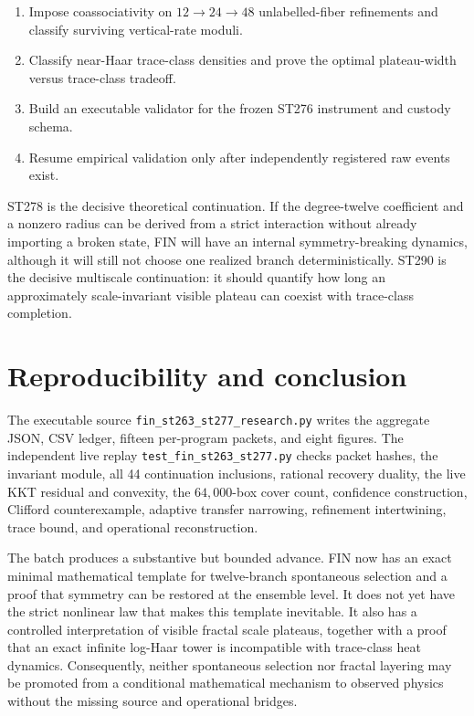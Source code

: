 \documentclass[11pt,a4paper]{article}
\begin{document}
\begin{enumerate}
from resetting costs.
\item[\textbf{ST289}.] Impose coassociativity on $12\to24\to48$ unlabelled-fiber refinements
and classify surviving vertical-rate moduli.
\item[\textbf{ST290}.] Classify near-Haar trace-class densities and prove the optimal
plateau-width versus trace-class tradeoff.
\item[\textbf{ST291}.] Build an executable validator for the frozen ST276 instrument and
custody schema.
\item[\textbf{ST292}.] Resume empirical validation only after independently registered raw
events exist.
\end{enumerate}

ST278 is the decisive theoretical continuation. If the degree-twelve coefficient and a
nonzero radius can be derived from a strict interaction without already importing a broken
state, FIN will have an internal symmetry-breaking dynamics, although it will still not
choose one realized branch deterministically. ST290 is the decisive multiscale continuation:
it should quantify how long an approximately scale-invariant visible plateau can coexist
with trace-class completion.

\section{Reproducibility and conclusion}

The executable source \texttt{fin\_st263\_st277\_research.py} writes the aggregate JSON,
CSV ledger, fifteen per-program packets, and eight figures. The independent live replay
\texttt{test\_fin\_st263\_st277.py} checks packet hashes, the invariant module, all 44
continuation inclusions, rational recovery duality, the live KKT residual and convexity,
the $64{,}000$-box cover count, confidence construction, Clifford counterexample, adaptive
transfer narrowing, refinement intertwining, trace bound, and operational reconstruction.

The batch produces a substantive but bounded advance. FIN now has an exact minimal
mathematical template for twelve-branch spontaneous selection and a proof that symmetry can
be restored at the ensemble level. It does not yet have the strict nonlinear law that makes
this template inevitable. It also has a controlled interpretation of visible fractal scale
plateaus, together with a proof that an exact infinite log-Haar tower is incompatible with
trace-class heat dynamics. Consequently, neither spontaneous selection nor fractal layering
may be promoted from a conditional mathematical mechanism to observed physics without the
missing source and operational bridges.
\end{document}

